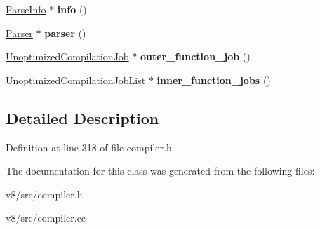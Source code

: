 \begin{DoxyCompactItemize}
\mbox{\hyperlink{classv8_1_1internal_1_1ParseInfo}{Parse\+Info}} $\ast$ {\bfseries info} ()
\item 
\mbox{\label{classv8_1_1internal_1_1BackgroundCompileTask_a2f7b88cd733f95c57dccc7fa4ceaf5a1}} 
\mbox{\hyperlink{classv8_1_1internal_1_1Parser}{Parser}} $\ast$ {\bfseries parser} ()
\item 
\mbox{\label{classv8_1_1internal_1_1BackgroundCompileTask_a67a54ed1021f9995e148275d14f2f920}} 
\mbox{\hyperlink{classv8_1_1internal_1_1UnoptimizedCompilationJob}{Unoptimized\+Compilation\+Job}} $\ast$ {\bfseries outer\+\_\+function\+\_\+job} ()
\item 
\mbox{\label{classv8_1_1internal_1_1BackgroundCompileTask_a7ead0522194d00d1751a526b290cf213}} 
Unoptimized\+Compilation\+Job\+List $\ast$ {\bfseries inner\+\_\+function\+\_\+jobs} ()
\end{DoxyCompactItemize}


\subsection{Detailed Description}


Definition at line 318 of file compiler.\+h.



The documentation for this class was generated from the following files\+:\begin{DoxyCompactItemize}
\item 
v8/src/compiler.\+h\item 
v8/src/compiler.\+cc\end{DoxyCompactItemize}
